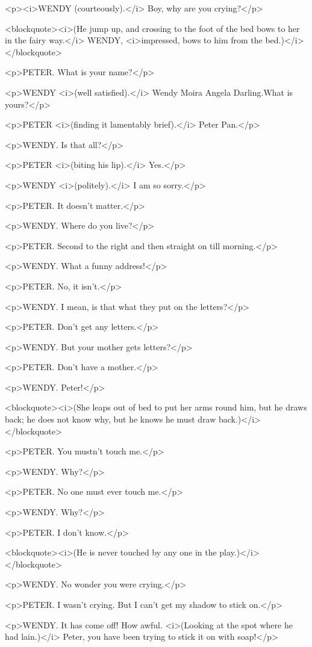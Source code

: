 <p><i>WENDY (courteously).</i> Boy, why are you crying?</p>

<blockquote><i>(He jump up, and crossing to the foot of the bed bows
to her in the fairy way.</i> WENDY, <i>impressed, bows to him from
the bed.)</i></blockquote>

<p>PETER. What is your name?</p>

<p>WENDY <i>(well satisfied).</i> Wendy Moira Angela Darling.What is
yours?</p>

<p>PETER <i>(finding it lamentably brief).</i> Peter Pan.</p>

<p>WENDY. Is that all?</p>

<p>PETER <i>(biting his lip).</i> Yes.</p>

<p>WENDY <i>(politely).</i> I am so sorry.</p>

<p>PETER. It doesn't matter.</p>

<p>WENDY. Where do you live?</p>

<p>PETER. Second to the right and then straight on till morning.</p>

<p>WENDY. What a funny address!</p>

<p>PETER. No, it isn't.</p>

<p>WENDY. I mean, is that what they put on the letters?</p>

<p>PETER. Don't get any letters.</p>

<p>WENDY. But your mother gets letters?</p>

<p>PETER. Don't have a mother.</p>

<p>WENDY. Peter!</p>

<blockquote><i>(She leaps out of bed to put her arms round him, but
he draws back; he does not know why, but he knows he must draw
back.)</i></blockquote>

<p>PETER. You mustn't touch me.</p>

<p>WENDY. Why?</p>

<p>PETER. No one must ever touch me.</p>

<p>WENDY. Why?</p>

<p>PETER. I don't know.</p>

<blockquote><i>(He is never touched by any one in the
play.)</i></blockquote>

<p>WENDY. No wonder you were crying.</p>

<p>PETER. I wasn't crying. But I can't get my shadow to stick on.</p>

<p>WENDY. It has come off! How awful. <i>(Looking at the spot where
he had lain.)</i> Peter, you have been trying to stick it on with
soap!</p>

